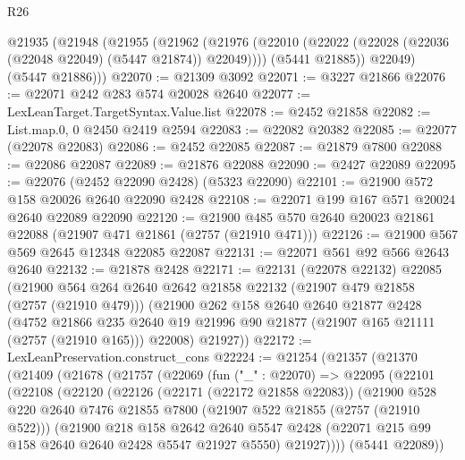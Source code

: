 \begin{lexlean}{R26}
\begin{coremodule}
    @21935
      (@21948
        (@21955
          (@21962
            (@21976 (@22010 (@22022 (@22028 (@22036 (@22048 @22049) (@5447 @21874)) @22049))))
            (@5441 @21885))
          @22049)
        (@5447 @21886)))
@22070 := @21309 @3092
@22071 := @3227 @21866
@22076 := @22071 @242 @283 @574 @20028 @2640
@22077 := LexLeanTarget.TargetSyntax.Value.list
@22078 := @2452 @21858
@22082 := List.map.{0, 0} @2450 @2419 @2594
@22083 := @22082 @20382
@22085 := @22077 (@22078 @22083)
@22086 := @2452 @22085
@22087 := @21879 @7800
@22088 := @22086 @22087
@22089 := @21876 @22088
@22090 := @2427 @22089
@22095 := @22076 (@2452 @22090 @2428) (@5323 @22090)
@22101 := @21900 @572 @158 @20026 @2640 @22090 @2428
@22108 := @22071 @199 @167 @571 @20024 @2640 @22089 @22090
@22120 := @21900 @485 @570 @2640 @20023 @21861 @22088 (@21907 @471 @21861 (@2757 (@21910 @471)))
@22126 := @21900 @567 @569 @2645 @12348 @22085 @22087
@22131 := @22071 @561 @92 @566 @2643 @2640
@22132 := @21878 @2428
@22171 := @22131
    (@22078 @22132)
    @22085
    (@21900
      @564
      @264
      @2640
      @2642
      @21858
      @22132
      (@21907 @479 @21858 (@2757 (@21910 @479)))
      (@21900
        @262
        @158
        @2640
        @2640
        @21877
        @2428
        (@4752
          @21866
          @235
          @2640
          @19
          @21996
          @90
          @21877
          (@21907 @165 @21111 (@2757 (@21910 @165)))
          @22008)
        @21927))
@22172 := LexLeanPreservation.construct_cons
@22224 := @21254
    (@21357
      (@21370
        (@21409
          (@21678
            (@21757
              (@22069
                (fun ("_" : @22070) =>
                @22095
                  (@22101
                    (@22108
                      (@22120
                        (@22126
                          (@22171 (@22172 @21858 @22083))
                          (@21900
                            @528
                            @220
                            @2640
                            @7476
                            @21855
                            @7800
                            (@21907 @522 @21855 (@2757 (@21910 @522)))
                            (@21900
                              @218
                              @158
                              @2642
                              @2640
                              @5547
                              @2428
                              (@22071 @215 @99 @158 @2640 @2640 @2428 @5547 @21927 @5550)
                              @21927))))
                      (@5441 @22089))

\end{coremodule}
\end{lexlean}

